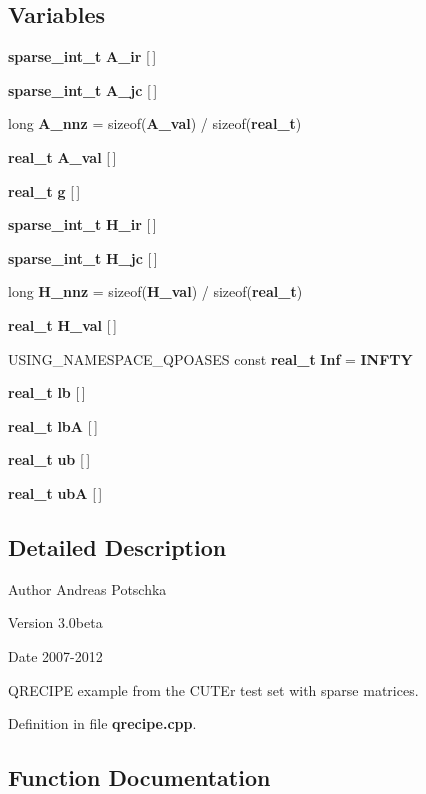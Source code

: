 \subsection*{Variables}
\begin{DoxyCompactItemize}
\item 
{\bf sparse\_\-int\_\-t} {\bf A\_\-ir} [$\,$]
\item 
{\bf sparse\_\-int\_\-t} {\bf A\_\-jc} [$\,$]
\item 
long {\bf A\_\-nnz} = sizeof({\bf A\_\-val}) / sizeof({\bf real\_\-t})
\item 
{\bf real\_\-t} {\bf A\_\-val} [$\,$]
\item 
{\bf real\_\-t} {\bf g} [$\,$]
\item 
{\bf sparse\_\-int\_\-t} {\bf H\_\-ir} [$\,$]
\item 
{\bf sparse\_\-int\_\-t} {\bf H\_\-jc} [$\,$]
\item 
long {\bf H\_\-nnz} = sizeof({\bf H\_\-val}) / sizeof({\bf real\_\-t})
\item 
{\bf real\_\-t} {\bf H\_\-val} [$\,$]
\item 
USING\_\-NAMESPACE\_\-QPOASES const {\bf real\_\-t} {\bf Inf} = {\bf INFTY}
\item 
{\bf real\_\-t} {\bf lb} [$\,$]
\item 
{\bf real\_\-t} {\bf lbA} [$\,$]
\item 
{\bf real\_\-t} {\bf ub} [$\,$]
\item 
{\bf real\_\-t} {\bf ubA} [$\,$]
\end{DoxyCompactItemize}


\subsection{Detailed Description}
\begin{DoxyAuthor}{Author}
Andreas Potschka 
\end{DoxyAuthor}
\begin{DoxyVersion}{Version}
3.0beta 
\end{DoxyVersion}
\begin{DoxyDate}{Date}
2007-\/2012
\end{DoxyDate}
QRECIPE example from the CUTEr test set with sparse matrices. 

Definition in file {\bf qrecipe.cpp}.



\subsection{Function Documentation}
